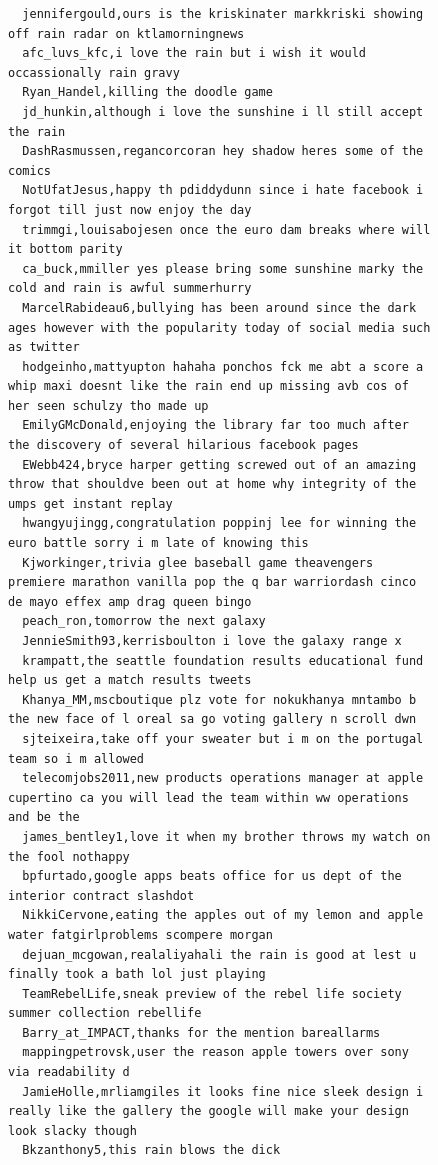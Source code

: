 \begin{figure}[htpb]
\begin{verbatim}
  jennifergould,ours is the kriskinater markkriski showing off rain radar on ktlamorningnews
  afc_luvs_kfc,i love the rain but i wish it would occassionally rain gravy
  Ryan_Handel,killing the doodle game
  jd_hunkin,although i love the sunshine i ll still accept the rain
  DashRasmussen,regancorcoran hey shadow heres some of the comics
  NotUfatJesus,happy th pdiddydunn since i hate facebook i forgot till just now enjoy the day
  trimmgi,louisabojesen once the euro dam breaks where will it bottom parity
  ca_buck,mmiller yes please bring some sunshine marky the cold and rain is awful summerhurry
  MarcelRabideau6,bullying has been around since the dark ages however with the popularity today of social media such as twitter
  hodgeinho,mattyupton hahaha ponchos fck me abt a score a whip maxi doesnt like the rain end up missing avb cos of her seen schulzy tho made up
  EmilyGMcDonald,enjoying the library far too much after the discovery of several hilarious facebook pages
  EWebb424,bryce harper getting screwed out of an amazing throw that shouldve been out at home why integrity of the umps get instant replay
  hwangyujingg,congratulation poppinj lee for winning the euro battle sorry i m late of knowing this
  Kjworkinger,trivia glee baseball game theavengers premiere marathon vanilla pop the q bar warriordash cinco de mayo effex amp drag queen bingo
  peach_ron,tomorrow the next galaxy
  JennieSmith93,kerrisboulton i love the galaxy range x
  krampatt,the seattle foundation results educational fund help us get a match results tweets
  Khanya_MM,mscboutique plz vote for nokukhanya mntambo b the new face of l oreal sa go voting gallery n scroll dwn
  sjteixeira,take off your sweater but i m on the portugal team so i m allowed
  telecomjobs2011,new products operations manager at apple cupertino ca you will lead the team within ww operations and be the
  james_bentley1,love it when my brother throws my watch on the fool nothappy
  bpfurtado,google apps beats office for us dept of the interior contract slashdot
  NikkiCervone,eating the apples out of my lemon and apple water fatgirlproblems scompere morgan
  dejuan_mcgowan,realaliyahali the rain is good at lest u finally took a bath lol just playing
  TeamRebelLife,sneak preview of the rebel life society summer collection rebellife
  Barry_at_IMPACT,thanks for the mention bareallarms
  mappingpetrovsk,user the reason apple towers over sony via readability d
  JamieHolle,mrliamgiles it looks fine nice sleek design i really like the gallery the google will make your design look slacky though
  Bkzanthony5,this rain blows the dick

\end{verbatim}
\end{figure}
